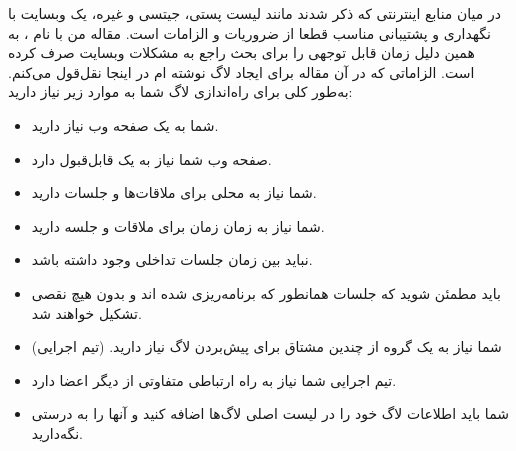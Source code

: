 در میان منابع اینترنتی که ذکر شدند مانند لیست پستی، جیتسی و غیره، یک وبسایت
با نگهداری و پشتیبانی مناسب قطعا از ضروریات و الزامات است. مقاله من با نام
،
به همین دلیل زمان قابل توجهی را برای بحث راجع به مشکلات وبسایت صرف کرده است.
الزاماتی که در آن مقاله برای ایجاد لاگ نوشته ام در اینجا نقل‌قول می‌کنم.
به‌طور کلی برای راه‌اندازی لاگ شما به موارد زیر نیاز دارید:


\begin{itemize}
\item
شما به یک صفحه وب نیاز دارید.
\item
صفحه وب شما نیاز به یک  قابل‌قبول دارد.
\item
شما نیاز به محلی برای ملاقات‌ها و جلسات دارید.
\item
شما نیاز به زمان زمان برای ملاقات و جلسه دارید.
\item
نباید بین زمان جلسات تداخلی وجود داشته باشد.
\item
باید مطمئن شوید که جلسات همانطور که برنامه‌ریزی شده اند و بدون هیچ نقصی تشکیل خواهند شد.
\item
شما نیاز به یک گروه از چندین مشتاق برای پیش‌بردن لاگ نیاز دارید. (تیم اجرایی)
\item
تیم اجرایی شما نیاز به راه ارتباطی متفاوتی از دیگر اعضا دارد.
\item
شما باید اطلاعات لاگ خود را در لیست اصلی لاگ‌ها اضافه کنید و آنها را به درستی نگه‌دارید.

\end{itemize}
